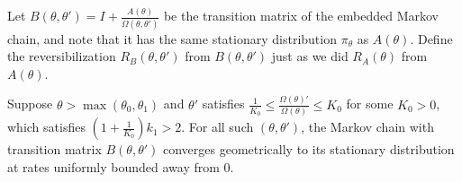 
Let $B(\theta, \theta') = I+\frac{A(\theta)}{\Omega(\theta, \theta')}$
be the transition matrix of the embedded Markov chain, and note that 
it has the same stationary distribution $\pi_\theta$ as $A(\theta)$.
Define the reversibilization $R_B(\theta,\theta')$ from $B(\theta,\theta')$ 
just as we did $R_A(\theta)$ from $A(\theta)$. 
\begin{lemma}
  Suppose $\theta > \max (\theta_0, \theta_1)$ and $\theta'$ satisfies 
$\frac{1}{K_0} \le \frac{\Omega(\theta)'}{\Omega(\theta)} \le K_0 $ for some $K_0 > 0$, which satisfies $(1 + \frac{1}{K_0})k_1 > 2$. 
For all such $(\theta,\theta')$, the Markov chain with transition matrix $B(\theta,\theta')$ converges geometrically to its stationary 
distribution at rates uniformly bounded away from $0$.

  \label{lem:eig_lemma}
\end{lemma}
